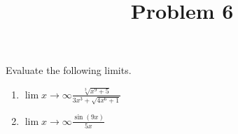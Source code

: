 \documentclass{ximera}
\title[Problem 6]{Problem 6}
\begin{document}
\begin{abstract} \end{abstract}
\maketitle

\begin{problem}
Evaluate the following limits.
	\begin{enumerate}
		\item $\displaystyle \lim{x \to \infty} \frac{\sqrt[3]{x^9+5}}{3x^3+ \sqrt{4x^6+1}}$\\[1in]
\item $\displaystyle \lim{x \to \infty} \frac{\sin(9x)}{5x}$
\end{enumerate}
\end{problem}
\end{document}
